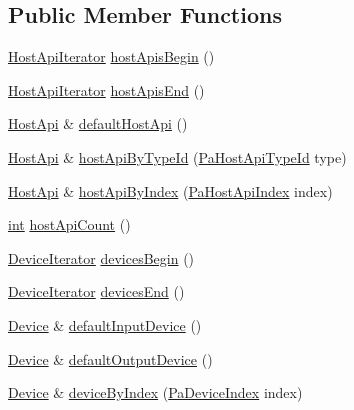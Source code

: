 \subsection*{Public Member Functions}
\begin{DoxyCompactItemize}
\item 
\hyperlink{classportaudio_1_1_system_1_1_host_api_iterator}{Host\+Api\+Iterator} \hyperlink{classportaudio_1_1_system_a9643a9a535125d468280fa2bec5f043b}{host\+Apis\+Begin} ()
\item 
\hyperlink{classportaudio_1_1_system_1_1_host_api_iterator}{Host\+Api\+Iterator} \hyperlink{classportaudio_1_1_system_aec200ed7d0882ef56a044f0de2a1729b}{host\+Apis\+End} ()
\item 
\hyperlink{classportaudio_1_1_host_api}{Host\+Api} \& \hyperlink{classportaudio_1_1_system_a8055f40b3e79fde47b198620b41513b9}{default\+Host\+Api} ()
\item 
\hyperlink{classportaudio_1_1_host_api}{Host\+Api} \& \hyperlink{classportaudio_1_1_system_a42c1842674b6195197846fe9ecb02909}{host\+Api\+By\+Type\+Id} (\hyperlink{portaudio_8h_a8eaebe3d39c5ea45598da8f86dc2e5ae}{Pa\+Host\+Api\+Type\+Id} type)
\item 
\hyperlink{classportaudio_1_1_host_api}{Host\+Api} \& \hyperlink{classportaudio_1_1_system_a6bafdef091da71ae2b86bae38ff23ef6}{host\+Api\+By\+Index} (\hyperlink{portaudio_8h_aeef6da084c57c70aa94be97411e19930}{Pa\+Host\+Api\+Index} index)
\item 
\hyperlink{xmltok_8h_a5a0d4a5641ce434f1d23533f2b2e6653}{int} \hyperlink{classportaudio_1_1_system_a208baeae6d73f27503348aa39d395fee}{host\+Api\+Count} ()
\item 
\hyperlink{classportaudio_1_1_system_1_1_device_iterator}{Device\+Iterator} \hyperlink{classportaudio_1_1_system_af3eb75f33944c43e94505dc9dc5eea7c}{devices\+Begin} ()
\item 
\hyperlink{classportaudio_1_1_system_1_1_device_iterator}{Device\+Iterator} \hyperlink{classportaudio_1_1_system_a1a0a705757f6fb82f3ad18ae270bd14a}{devices\+End} ()
\item 
\hyperlink{classportaudio_1_1_device}{Device} \& \hyperlink{classportaudio_1_1_system_a53e704fcd14e822f70f7e4b3a6d63847}{default\+Input\+Device} ()
\item 
\hyperlink{classportaudio_1_1_device}{Device} \& \hyperlink{classportaudio_1_1_system_a696573d9c09fceb0d0224c77dc453606}{default\+Output\+Device} ()
\item 
\hyperlink{classportaudio_1_1_device}{Device} \& \hyperlink{classportaudio_1_1_system_a32021f6e5dff4b43f8a7740bdf0919fb}{device\+By\+Index} (\hyperlink{portaudio_8h_ad79317e65bde63d76c4b8e711ac5a361}{Pa\+Device\+Index} index)

\end{DoxyCompactItemize}
